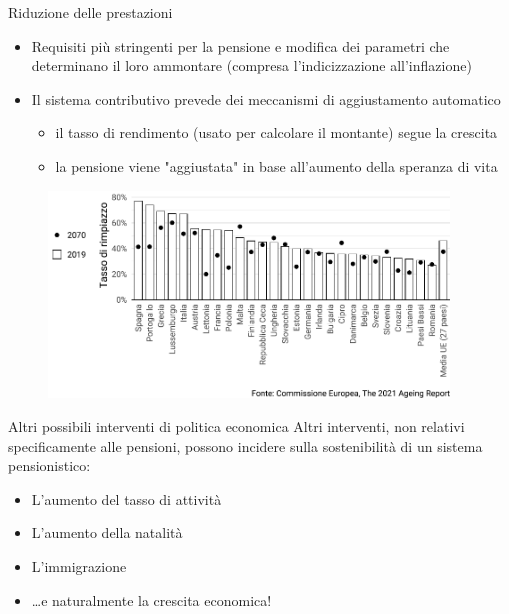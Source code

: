 \documentclass[11pt]{beamer}
\begin{document}
\begin{frame}{Riduzione delle prestazioni}
\begin{itemize}
\item Requisiti più stringenti per la pensione e modifica dei parametri che
determinano il loro ammontare (compresa l'indicizzazione all'inflazione)
\item Il sistema contributivo prevede dei meccanismi di aggiustamento automatico
\begin{itemize}
\item il tasso di rendimento (usato per calcolare il montante) segue la crescita
\item la pensione viene "aggiustata" in base all'aumento della speranza di vita
\end{itemize}
\end{itemize}

\begin{figure}[htbp]
\centering
\includegraphics[height=5.5cm]{./figure/tassi-rimpiazzo-2019-2070.pdf}
\end{figure}
\end{frame}

\begin{frame}{Altri possibili interventi di politica economica}
Altri interventi, non relativi specificamente alle pensioni, possono incidere sulla sostenibilità di un sistema pensionistico: 
\begin{itemize}
\item L'aumento del tasso di attività
\item L'aumento della natalità
\item L'immigrazione
\item \ldots{}e naturalmente la crescita economica!
\end{itemize}
\end{frame}
\end{document}
